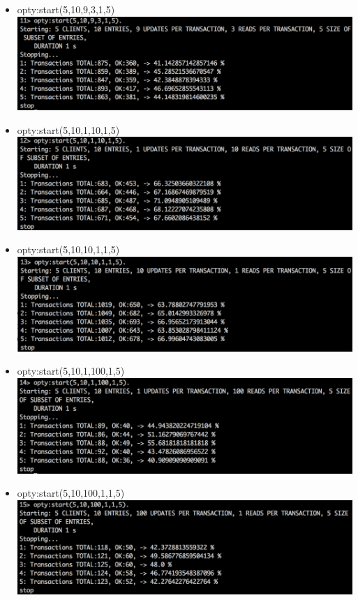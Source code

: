\documentclass[a4paper, 11pt]{article}
\begin{document}
\begin{itemize}
\item opty:start(5,10,9,3,1,5)\\
\includegraphics[scale=0.5]{images/exp-iv-4.png} \\
\item opty:start(5,10,1,10,1,5)\\
\includegraphics[scale=0.5]{images/exp-iv-5.png} \\
\item opty:start(5,10,10,1,1,5)\\
\includegraphics[scale=0.5]{images/exp-iv-6.png} \\
\item opty:start(5,10,1,100,1,5)\\
\includegraphics[scale=0.5]{images/exp-iv-7.png} \\
\item opty:start(5,10,100,1,1,5)\\
\includegraphics[scale=0.5]{images/exp-iv-8.png} \\
\end{itemize}
\end{document}
